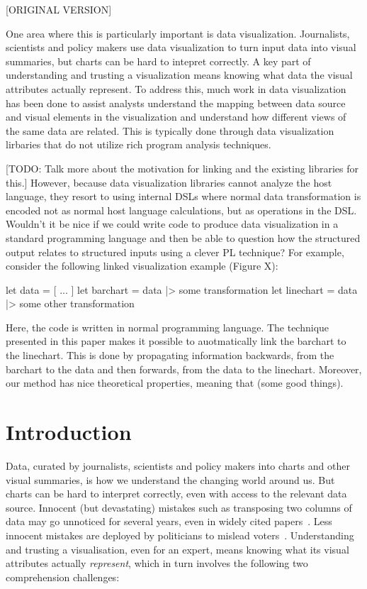 [ORIGINAL VERSION]

One area where this is particularly important is data visualization. Journalists, scientists and policy makers use data visualization to turn input data into visual summaries, but charts can be hard to intepret correctly. A key part of understanding and trusting a visualization means knowing what data the visual attributes actually represent. To address this, much work in data visualization has been done to assist analysts understand the mapping between data source and visual elements in the visualization and understand how different views of the same data are related. This is typically done through data visualization lirbaries that do not utilize rich program analysis techniques.

[TODO: Talk more about the motivation for linking and the existing libraries for this.]
However, because data visualization libraries cannot analyze the host language, they resort to using internal DSLs where normal data transformation is encoded not as normal host language calculations, but as operations in the DSL. Wouldn't it be nice if we could write code to produce data visualization in a standard programming language and then be able to question how the structured output relates to structured inputs using a clever PL technique? For example, consider the following linked visualization example (Figure X):

let data = [ ... ]
let barchart = data |> some transformation
let linechart = data |> some other transformation

Here, the code is written in normal programming language. The technique presented in this paper makes it possible to auotmatically link the barchart to the linechart. This is done by propagating information backwards, from the barchart to the data and then forwards, from the data to the linechart. Moreover, our method has nice theoretical properties, meaning that (some good things).

\section{Introduction}

Data, curated by journalists, scientists and policy makers into charts and other visual summaries, is how we understand the changing world around us. But charts can be hard to interpret correctly, even with access to the relevant data source. Innocent (but devastating) mistakes such as transposing two columns of data may go unnoticed for several years, even in widely cited papers~\cite{miller06}. Less innocent mistakes are deployed by politicians to mislead voters~\cite{fullfact19}. Understanding and trusting a visualisation, even for an expert, means knowing what its visual attributes actually \emph{represent}, which in turn involves the following two comprehension challenges:

